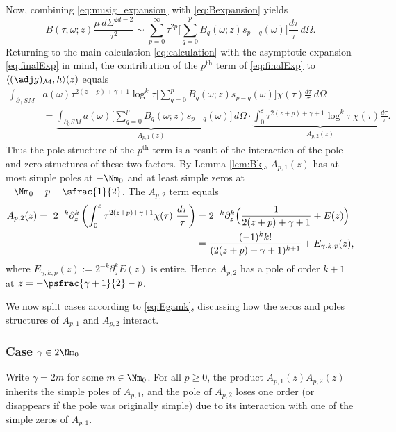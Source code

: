 Now, combining \eqref{eq:musig_expansion} with \eqref{eq:Bexpansion} yields
\begin{equation}
B(\tau,\omega; z) \frac{\mu \, d\Sigma^{2d-2}}{\tau^2} \sim \sum_{p=0}^\infty \tau^{2p}
\biggl[\sum_{q=0}^{p} B_q(\omega; z) s_{p-q}(\omega) \biggr] \frac{d\tau}{\tau}\,d\Omega.
\label{eq:finalExp}
\end{equation}
Returning to the main calculation \eqref{eq:calculation} with the asymptotic expansion \eqref{eq:finalExp} in mind, the contribution of the $p^{\mathrm{th}}$ term of \eqref{eq:finalExp} to $\langle (\adj g)_{\cal M}, h\rangle(z)$ equals
\begin{align*}
\int_{\partial_+ SM} & a(\omega) \tau^{2(z+p)+\gamma+1} \log^k\tau \biggl[\sum_{q=0}^{p} B_q(\omega; z) s_{p-q}(\omega) \biggr]
\chi(\tau) \frac{d\tau}{\tau}\,d\Omega \\
&= \underbrace{\int_{\partial_0 SM} a(\omega) \biggl[\sum_{q=0}^{p} B_q(\omega; z) s_{p-q}(\omega) \biggr]\,d\Omega}_{A_{p,1}(z)} \cdot \underbrace{\int_0^\varepsilon \tau^{2(z+p)+\gamma+1} \log^k \tau \, \chi(\tau) \frac{d\tau}{\tau}}_{A_{p,2}(z)}.
\end{align*}
Thus the pole structure of the $p^{\mathrm{th}}$ term is a result of the interaction of the pole and zero structures of these two factors.
By Lemma \ref{lem:Bk}, $A_{p,1}(z)$ has at most simple poles at $-\Nm_0$ and at least simple zeros at $-\Nm_0 - p - \sfrac{1}{2}$. The $A_{p,2}$ term equals
\begin{align*}
A_{p,2}(z) = \ 2^{-k} \partial_z^k \left(\int_0^\varepsilon \tau^{2(z+p)+\gamma+1} \chi(\tau)\ \frac{d\tau}{\tau} \right) &= 2^{-k} \partial_z^k \Bigl(\frac{1}{2(z+p)+\gamma+1} + E(z) \Bigr) \\
&= \frac{(-1)^k k!}{(2(z+p) + \gamma+1)^{k+1}} + E_{\gamma,k,p}(z),
\end{align*}
where $E_{\gamma,k,p}(z) := 2^{-k} \partial_z^k E(z)$ is entire. Hence $A_{p,2}$ has a pole of order $k+1$ at $z = -\psfrac{\gamma+1}{2}-p$.

We now split cases according to \eqref{eq:Egamk}, discussing how the zeros and poles structures of $A_{p,1}$ and $A_{p,2}$ interact.

\subsubsection*{Case $\gamma\in 2\Nm_0$}
Write $\gamma = 2m$ for some $m\in \Nm_0$. For all $p\ge 0$, the product $A_{p,1}(z) A_{p,2}(z)$ inherits the simple poles of $A_{p,1}$, and the pole of $A_{p,2}$ loses one order (or disappears if the pole was originally simple) due to its interaction with one of the simple zeros of $A_{p,1}$.

